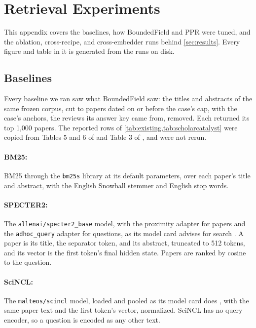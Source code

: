 \section{Retrieval Experiments}
\label{app:retrieval}

This appendix covers the baselines, how BoundedField and PPR were tuned, and the ablation, cross-recipe, and cross-embedder runs behind \cref{sec:results}. Every figure and table in it is generated from the runs on disk.

\subsection{Baselines}
\label{app:baselines}

Every baseline we ran saw what BoundedField saw: the titles and abstracts of the same frozen corpus, cut to papers dated on or before the case's cap, with the case's anchors, the reviews its answer key came from, removed. Each returned its top 1,000 papers. The reported rows of \cref{tab:existing,tab:scholarcatalyst} were copied from Tables 5 and 6 of \citet{he2025pasa} and Table 3 of \citet{kim2026scholarcatalyst}, and were not rerun.

\paragraph{BM25:}
BM25 \citep{robertson2009bm25} through the \texttt{bm25s} library at its default parameters, over each paper's title and abstract, with the English Snowball stemmer and English stop words.

\paragraph{SPECTER2:}
The \texttt{allenai/specter2\_base} model, with the proximity adapter for papers and the \texttt{adhoc\_query} adapter for questions, as its model card advises for search \citep{singh2022scirepeval}. A paper is its title, the separator token, and its abstract, truncated to 512 tokens, and its vector is the first token's final hidden state. Papers are ranked by cosine to the question.

\paragraph{SciNCL:}
The \texttt{malteos/scincl} model, loaded and pooled as its model card does \citep{ostendorff2022scincl}, with the same paper text and the first token's vector, normalized. SciNCL has no query encoder, so a question is encoded as any other text.

